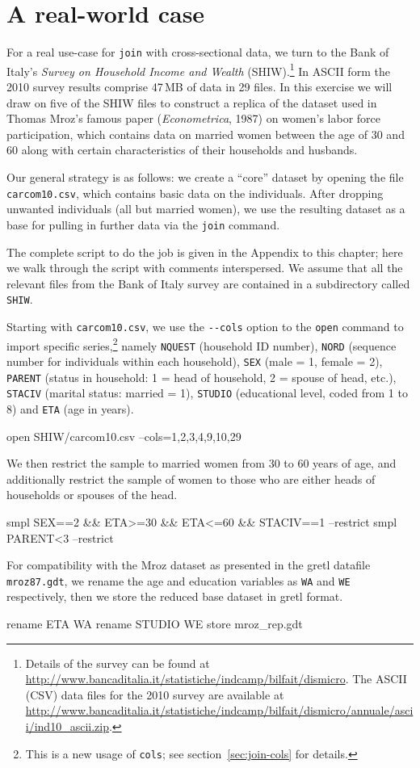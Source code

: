 \section{A real-world case}
\label{sec:join-SHIW}

For a real use-case for \texttt{join} with cross-sectional data, we
turn to the Bank of Italy's \textit{Survey on Household Income and
  Wealth} (SHIW).\footnote{Details of the survey can be found at
  \url{http://www.bancaditalia.it/statistiche/indcamp/bilfait/dismicro}.
  The ASCII (CSV) data files for the 2010 survey are available at
  \url{http://www.bancaditalia.it/statistiche/indcamp/bilfait/dismicro/annuale/ascii/ind10_ascii.zip}.}
In ASCII form the 2010 survey results comprise 47\,MB of data in 29
files. In this exercise we will draw on five of the SHIW files to
construct a replica of the dataset used in Thomas Mroz's famous paper
(\textit{Econometrica}, 1987) on women's labor force participation,
which contains data on married women between the age of 30 and 60
along with certain characteristics of their households and husbands.

Our general strategy is as follows: we create a ``core'' dataset by
opening the file \texttt{carcom10.csv}, which contains basic data on
the individuals. After dropping unwanted individuals (all but married
women), we use the resulting dataset as a base for pulling in further
data via the \texttt{join} command.

The complete script to do the job is given in the Appendix to this
chapter; here we walk through the script with comments interspersed.
We assume that all the relevant files from the Bank of Italy survey
are contained in a subdirectory called \texttt{SHIW}.

Starting with \texttt{carcom10.csv}, we use the \verb|--cols| option
to the \texttt{open} command to import specific series,\footnote{This
  is a new usage of \texttt{cols}; see section~\ref{sec:join-cols} for
  details.} namely \texttt{NQUEST} (household ID number),
\texttt{NORD} (sequence number for individuals within each household),
\texttt{SEX} (male = 1, female = 2), \texttt{PARENT} (status in
household: 1 = head of household, 2 = spouse of head, etc.),
\texttt{STACIV} (marital status: married = 1), \texttt{STUDIO}
(educational level, coded from 1 to 8) and \texttt{ETA} (age in
years).
%
\begin{code}
open SHIW/carcom10.csv --cols=1,2,3,4,9,10,29
\end{code}
%
We then restrict the sample to married women from 30 to 60 years of
age, and additionally restrict the sample of women to those who are
either heads of households or spouses of the head.
%
\begin{code}
smpl SEX==2 && ETA>=30 && ETA<=60 && STACIV==1 --restrict
smpl PARENT<3  --restrict
\end{code}
%
For compatibility with the Mroz dataset as presented in the gretl
datafile \texttt{mroz87.gdt}, we rename the age and education
variables as \texttt{WA} and \texttt{WE} respectively, then we
store the reduced base dataset in gretl format.
%
\begin{code}
rename ETA WA
rename STUDIO WE
store mroz_rep.gdt
\end{code}

